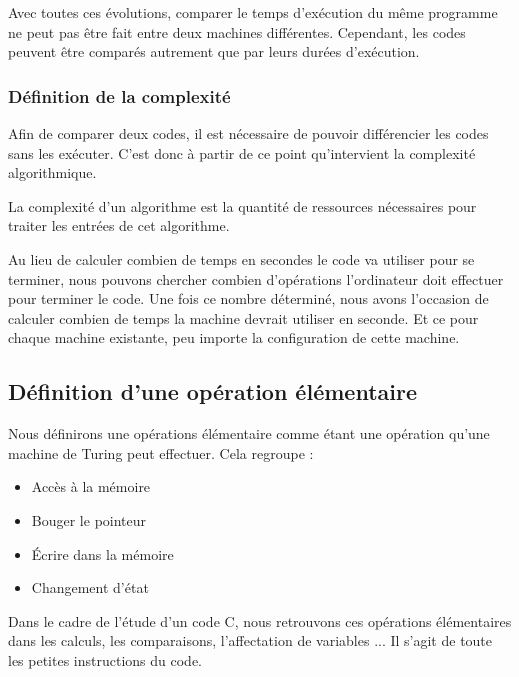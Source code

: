 \documentclass[12pt, twoside, openright]{report}
\begin{document}
Avec toutes ces évolutions, comparer le temps d'exécution du même programme ne peut pas être fait entre deux machines différentes. Cependant, les codes peuvent être comparés autrement que par leurs durées d'exécution.


\subsubsection{Définition de la complexité }

Afin de comparer deux codes, il est nécessaire de pouvoir différencier les codes sans les exécuter. C'est donc à partir de ce point qu'intervient la complexité algorithmique.

La complexité d'un algorithme est la quantité de ressources nécessaires pour traiter les entrées de cet algorithme.\cite{complexite01}

Au lieu de calculer combien de temps en secondes le code va utiliser pour se terminer, nous pouvons chercher combien d'opérations l'ordinateur doit effectuer pour terminer le code. Une fois ce nombre déterminé, nous avons l'occasion de calculer combien de temps la machine devrait utiliser en seconde. Et ce pour chaque machine existante, peu importe la configuration de cette machine.

\subsection{Définition d'une opération élémentaire}

Nous définirons une opérations élémentaire comme étant une opération qu'une machine de Turing peut effectuer. Cela regroupe :

\begin{itemize}
    \item Accès à la mémoire 
    \item Bouger le pointeur
    \item Écrire dans la mémoire
    \item Changement d'état
\end{itemize}

Dans le cadre de l'étude d'un code C, nous retrouvons ces opérations élémentaires dans les calculs, les comparaisons, l'affectation de variables ... Il s'agit de toute les petites instructions du code.
\end{document}
